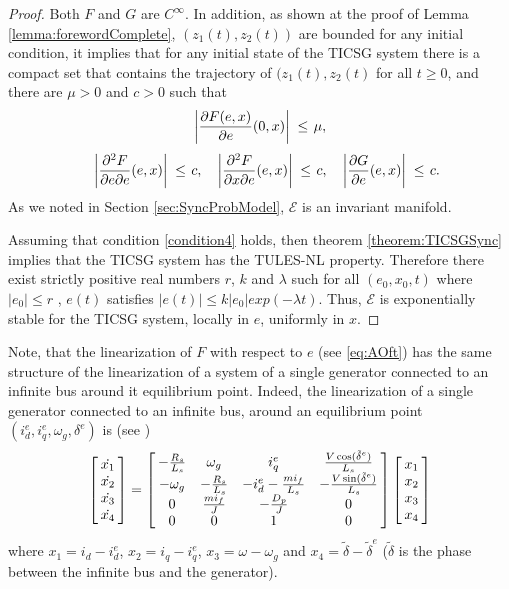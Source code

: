 \documentclass[letterpaper, 10 pt, conference]{ieeeconf}
\renewcommand{\o}    {{\omega}}
\newcommand{\m}      {{\hbox{\hskip 1pt}}}
\newcommand{\nm}     {{\hbox{\hskip -3pt}}}
\begin{document}
\begin{proof}
Both $F$ and $G$ are $C^\infty$. In addition, as shown at the proof of
Lemma \ref{lemma:forewordComplete}, $\left(z_1(t),z_2(t)\right)$ are
bounded for any initial condition, it implies that for any initial
state of the TICSG system there is a compact set that contains the
trajectory of $(z_1(t),z_2(t)$ for all $t \geq 0$, and there are
$\mu>0$ and $c>0$ such that
$$\left|\frac{\partial F(e,x)}{\partial e}(0,x)\right| \m\leq\m \mu,$$
$$ \quad \left| \frac{\partial^2 F}{\partial e \partial e}(e,x)\right|
   \m\leq\m c, \quad \left| \frac{\partial^2 F}{\partial x \partial e}
   (e,x)\right| \m\leq\m c,\quad\left| \frac{\partial G}{\partial e}
   (e,x) \right| \m\leq\m c.$$
As we noted in Section \ref{sec:SyncProbModel}, $\mathscr{E}$ is an 
invariant manifold.

Assuming that condition \ref{condition4} holds, then theorem
\ref{theorem:TICSGSync} implies that the TICSG system has the TULES-NL
property. Therefore there exist strictly positive real numbers $r$,
$k$ and $\lambda$ such for all $(e_0,x_0,t)$ where $\left| e_0 \right|
\le r $ , $e(t)$ satisfies $\left|e(t)\right|\leq k\left|e_0
\right|exp(-\lambda t)$. Thus, $\mathscr{E}$ is exponentially stable
for the TICSG system, locally in $e$, uniformly in $x$.
\end{proof}

Note, that the linearization of $F$ with respect to $e$ (see
\eqref{eq:AOft}) has the same structure of the linearization of a
system of a single generator connected to an infinite bus around it
equilibrium point. Indeed, the linearization of a single generator
connected to an infinite bus, around an equilibrium point
$(i^e_d,i^e_q,\o_g, \delta^e)$ is (see \cite[formula (3.4)]{NaWe:15})
$$ \left[\nm\begin{array}{c} \dot{x_1} \\ \dot{x_2 }\\ \dot{x_3} \\
   \dot{x_4} \end{array}\nm\right]=\left[\nm\begin{array}{cccc}
   -\frac{R_s}{L_s} & \omega_g & i_q^e & \frac{V\cos(\tilde
   {\delta}^e)}{L_s}\\ -\o_g & -\frac{R_s}{L_s} & -i_d^e-\frac{mi_f}
   {L_s} & -\frac{V\sin(\tilde{\delta}^e)}{L_s}\\ 0 & \frac{mi_{f}}
   {J} & -\frac{D_{p}}{J} & 0\\ 0 & 0 & 1 & 0 \end{array}\nm\right]  
   \left[\nm\begin{array}{c} x_1 \\ x_2 \\ x_3 \\ x_4
   \end{array}\nm\right]$$
where $x_1 = i_d-i^e_d$, $x_2 = i_q-i_q^e$, $x_3=\o-\o_g$ and
$x_4= \tilde{\delta} - \tilde{\delta}^e$ ($\tilde{\delta}$ is the
phase between the infinite bus and the generator).
\end{document}
